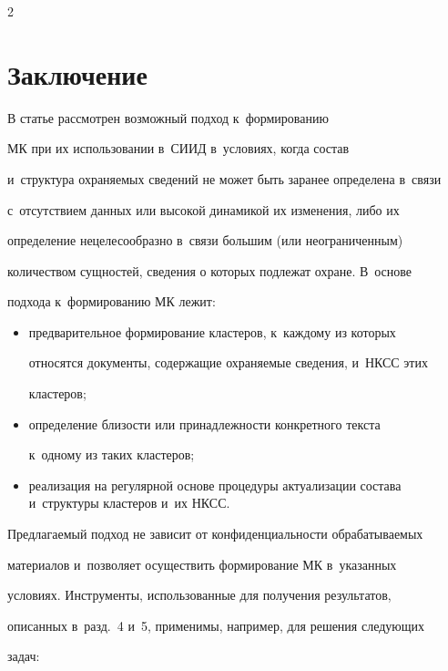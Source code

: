 \begin{multicols}{2}
\section{Заключение}


     


  В статье рассмотрен возможный подход к~формированию 


МК при их использовании в~СИИД в~условиях, когда состав 


и~структура охраняемых сведений не может быть заранее определена в~связи 


с~отсутствием данных или высокой динамикой их изменения, либо их 


определение нецелесообразно в~связи большим (или неограниченным) 


количеством сущностей, сведения о которых подлежат охране. В~основе 


подхода к~формированию МК лежит:


  \begin{itemize}


  \item  предварительное формирование кластеров, к~каждому из которых 


относятся документы, содержащие охраняемые сведения, и~НКСС этих 


кластеров;


  \item определение близости или принадлежности конкретного текста 


  к~одному из таких кластеров;


  \item  реализация на регулярной основе процедуры актуализации состава и~структуры кластеров и~их НКСС.


  \end{itemize}


  


  Предлагаемый подход не зависит от конфиденциальности обрабатываемых 


материалов и~позволяет осуществить формирование МК в~указанных 


условиях. Инструменты, использованные для получения результатов, 


описанных в~разд.~4 и~5, применимы, например, для решения следующих 


задач:


  \begin{itemize} 



\end{itemize}
\end{multicols}
